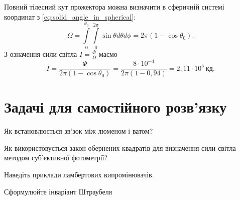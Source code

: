 
\begin{solutionexample}

	Повний тілесний кут прожектора можна визначити в сферичній системі координат з \eqref{eq:solid_angle_in_spherical}:
	\begin{equation*}
		\Omega = \int\limits_0^{\theta_0} \int\limits_0^{2\pi} \sin\theta d\theta d\phi = 2\pi (1- \cos\theta_0).
	\end{equation*}
	З означення сили світла $I = \frac{\Phi}{\Omega}$ маємо
	\begin{equation*}
		I = \frac{\Phi}{2\pi (1- \cos\theta_0)} = \frac{8\cdot10^{-4}}{2\pi(1- 0,94)} = 2,11\cdot10^5\ \text{кд}.
	\end{equation*}
\end{solutionexample}


\section{Задачі для самостійного розв’язку}


\begin{problem}%
Як встановлюється зв’зок між люменом і ватом?
\end{problem}


\begin{problem}%
Як використовується закон обернених квадратів для визначення сили
світла методом суб’єктивної фотометрії?
\end{problem}


\begin{problem}%
Наведіть приклади ламбертових випромінювачів.
\end{problem}


\begin{problem}%
Сформулюйте інваріант Штраубеля
\end{problem}



